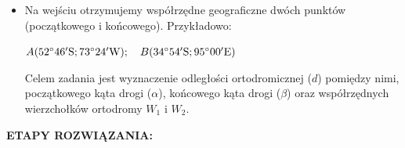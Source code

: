 \documentclass[10pt, twoside, fleqn]{article}
\begin{document}
		\begin{itemize}
				\item	Na wejściu otrzymujemy współrzędne geograficzne dwóch
						punktów (początkowego i końcowego). Przykładowo:
		
							$ A(52\degree 46' \mathrm{ S} ; 
								73\degree 24' \mathrm{W}) ;
								\hspace{10pt}
		  					  B(34\degree 54' \mathrm{S} ; 
		  						95\degree 00' \mathrm{E}) $
										
						Celem zadania jest wyznaczenie odległości ortodromicznej 
						($d$) pomiędzy nimi, początkowego
						kąta drogi ($\alpha$), końcowego kąta drogi ($\beta$) oraz
						współrzędnych wierzchołków ortodromy $W_1$ i $W_2$.		
	
		\end{itemize}

		\newpage
		\textbf{ETAPY ROZWIĄZANIA:}
		
\end{document}
